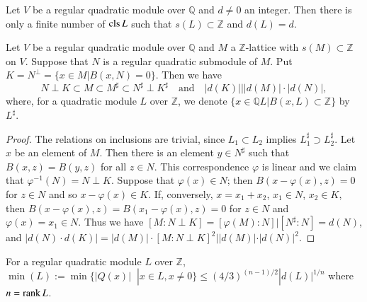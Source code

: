 \setcounter{prop}{24}
\begin{prop}\label{c2:prop-2.25}
Let $V$ be a regular quadratic module over $\mathbb{Q}$ and $d\neq 0$
an integer. Then there is only a finite number of $\operatorname{cls} L$ such that
$s(L)\subset \mathbb{Z}$ and $d(L)=d$.
\end{prop}

\setcounter{lemma}{25}
\begin{lemma}\label{c2:lem-2.26}
Let $V$ be a regular quadratic module over $\mathbb{Q}$ and $M$ a
$\mathbb{Z}$-lattice with $s(M)\subset \mathbb{Z}$ on $V$. Suppose
that $N$ is a regular quadratic submodule of $M$. Put
$K=N^{\perp}=\{x\in M|B(x,N)=0\}$. Then we have
$$
N\perp K\subset M\subset M^{\sharp}\subset N^{\sharp}\perp
K^{\sharp}\quad\text{and}\quad |d(K)|\Big||d(M)|\cdot  |d(N)|,
$$
where, for a quadratic module $L$ over $\mathbb{Z}$, we denote
$\{x\in\mathbb{Q}L|B(x,L)\subset\mathbb{Z}\}$ by $L^{\sharp}$. 
\end{lemma}

\begin{proof}
The relations on inclusions are trivial, since $L_{1}\subset L_{2}$
implies $L^{\sharp}_{1}\supset L^{\sharp}_{2}$. Let $x$ be an element
of $M$. Then there is an element $y\in N^{\sharp}$ such that
$B(x,z)=B(y,z)$ for all $z\in N$. This correspondence $\varphi$ is
linear and we claim that $\varphi^{-1}(N)=N\perp K$. Suppose that
$\varphi(x)\in N$; then $B(x-\varphi(x),z)=0$ for $z\in N$ and so
$x-\varphi(x)\in K$. If, conversely, $x=x_{1}+x_{2}$, $x_{1}\in N$,
$x_{2}\in K$, then $B(x-\varphi(x),z)=B(x_{1}-\varphi(x),z)=0$ for
$z\in N$ and $\varphi(x)=x_{1}\in N$. Thus we have $[M:N\perp
  K]=[\varphi(M):N]|[N^{\sharp}:N]=d(N)$, and $|d(N)\cdot
d(K)|=|d(M)|\cdot [M:N\perp K]^{2}||d(M)|\cdot |d(N)|^{2}$. 
\end{proof}

\begin{lemma}\label{c2:lem-2.27}
For a regular quadratic module $L$ over $\mathbb{Z}$, $\min
(L):=\min\{|Q(x)| \;\; |x\in L,x\neq 0\}\leq (4/3)^{(n-1)/2}|d(L)|^{1/n}$
where $n=\operatorname{rank} L$.
\end{lemma}

